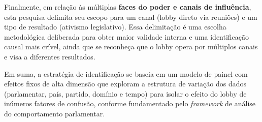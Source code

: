 Finalmente, em relação às múltiplas \textbf{faces do poder e canais de influência}, esta pesquisa delimita seu escopo para um canal (lobby direto via reuniões) e um tipo de resultado (ativismo legislativo). Essa delimitação é uma escolha metodológica deliberada para obter maior validade interna e uma identificação causal mais crível, ainda que se reconheça que o lobby opera por múltiplos canais e visa a diferentes resultados.

Em suma, a estratégia de identificação se baseia em um modelo de painel com efeitos fixos de alta dimensão que exploram a estrutura de variação dos dados (parlamentar, país, partido, domínio e tempo) para isolar o efeito do lobby de inúmeros fatores de confusão, conforme fundamentado pelo \textit{framework} de análise do comportamento parlamentar.

